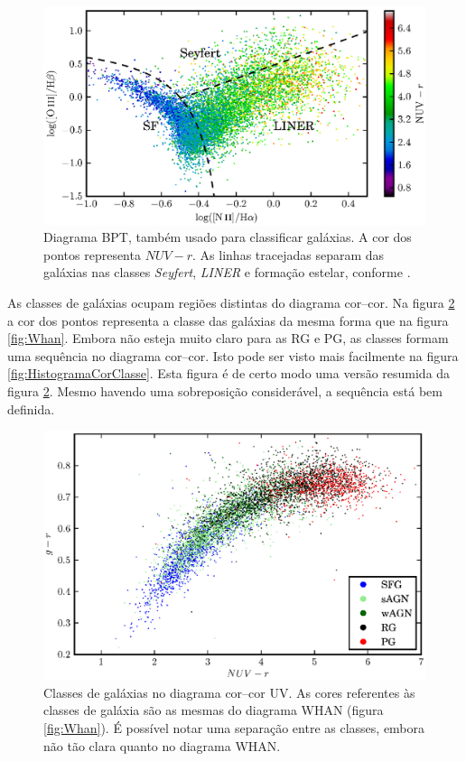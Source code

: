 \begin{figure}
	\includegraphics{figuras/bpt-uv.eps}
	\caption[Cores ultravioleta no diagrama BPT.]
	{Diagrama BPT, também usado para classificar galáxias. A cor dos
	pontos representa $NUV-r$. As linhas tracejadas separam das galáxias nas
	classes {\em Seyfert}, {\em LINER} e formação estelar, conforme
	\citet[linhas S06 e K06 da tabela 1]{CidFernandes2010}.}
	\label{fig:BPTUV}
\end{figure}

As classes de galáxias ocupam regiões distintas do diagrama cor--cor. Na figura
\ref{fig:ColorClass} a cor dos pontos representa a classe das galáxias da mesma
forma que na figura \ref{fig:Whan}. Embora não esteja muito claro para as RG e
PG, as classes formam uma sequência no diagrama cor--cor. Isto pode ser visto
mais facilmente na figura \ref{fig:HistogramaCorClasse}. Esta figura é de certo
modo uma versão resumida da figura \ref{fig:ColorClass}. Mesmo havendo uma
sobreposição considerável, a sequência está bem definida.

\begin{figure}
	\includegraphics{figuras/uvcolor-color-class.eps}
	\caption[Diagrama cor--cor UV de acordo com o tipo de galáxia.]
	{Classes de galáxias no diagrama cor--cor UV. As cores referentes às classes de
	galáxia são as mesmas do diagrama WHAN (figura \ref{fig:Whan}). É possível
	notar uma separação entre as classes, embora não tão clara quanto no diagrama
	WHAN.}
	\label{fig:ColorClass}
\end{figure}

